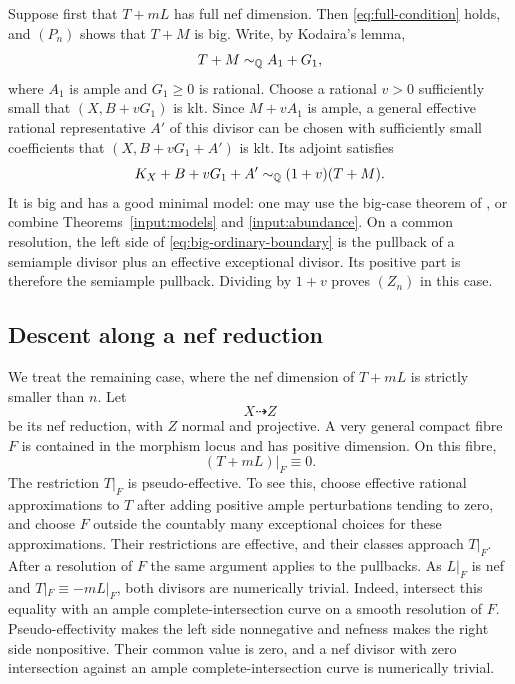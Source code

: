 Suppose first that $T+mL$ has full nef dimension.  Then
\eqref{eq:full-condition} holds, and $(P_n)$ shows that $T+M$ is big.
Write, by Kodaira's lemma,
\[
                     T+M\sim_\mathbb Q A_1+G_1,
\]
where $A_1$ is ample and $G_1\geq0$ is rational.  Choose a rational
$v>0$ sufficiently small that $(X,B+vG_1)$ is klt.  Since
$M+vA_1$ is ample, a general effective rational representative
$A'$ of this divisor can be chosen with sufficiently small
coefficients that $(X,B+vG_1+A')$ is klt.  Its adjoint satisfies
\begin{equation}\label{eq:big-ordinary-boundary}
 K_X+B+vG_1+A'\sim_\mathbb Q(1+v)(T+M).
\end{equation}
It is big and has a good minimal model: one may use the big-case
theorem of \cite{BCHM}, or combine
Theorems~\ref{input:models} and \ref{input:abundance}.
On a common resolution, the left side of
\eqref{eq:big-ordinary-boundary} is the pullback of a semiample
divisor plus an effective exceptional divisor.  Its positive part
is therefore the semiample pullback.  Dividing by $1+v$ proves
$(Z_n)$ in this case.

\subsection{Descent along a nef reduction}

We treat the remaining case, where the nef dimension of $T+mL$ is
strictly smaller than $n$.  Let
\[
                         X\dashrightarrow Z
\]
be its nef reduction, with $Z$ normal and projective.  A very general
compact fibre $F$ is contained in the morphism locus and has positive
dimension.  On this fibre,
\[
                         (T+mL)|_F\equiv0.
\]
The restriction $T|_F$ is pseudo-effective.  To see this, choose
effective rational approximations to $T$ after adding positive ample
perturbations tending to zero, and choose $F$ outside the countably
many exceptional choices for these approximations.  Their
restrictions are effective, and their classes approach $T|_F$.
After a resolution of $F$ the same argument applies to the pullbacks.
As $L|_F$ is nef and $T|_F\equiv-mL|_F$, both divisors are
numerically trivial.  Indeed, intersect this equality with an ample
complete-intersection curve on a smooth resolution of $F$.
Pseudo-effectivity makes the left side nonnegative and nefness makes
the right side nonpositive.  Their common value is zero, and a nef
divisor with zero intersection against an ample complete-intersection
curve is numerically trivial.

